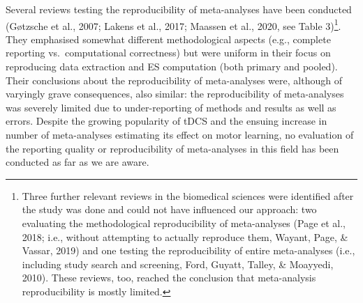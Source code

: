 \documentclass[
  man,floatsintext]{apa6}
\begin{document}
Several reviews testing the reproducibility of meta-analyses have been conducted (Gøtzsche et al., 2007; Lakens et al., 2017; Maassen et al., 2020, see Table 3)\footnote{Three further relevant reviews in the biomedical sciences were identified after the study was done and could not have influenced our approach: two evaluating the methodological reproducibility of meta-analyses (Page et al., 2018; i.e., without attempting to actually reproduce them, Wayant, Page, \& Vassar, 2019) and one testing the reproducibility of entire meta-analyses (i.e., including study search and screening, Ford, Guyatt, Talley, \& Moayyedi, 2010). These reviews, too, reached the conclusion that meta-analysis reproducibility is mostly limited.}. They emphasised somewhat different methodological aspects (e.g., complete reporting vs.~computational correctness) but were uniform in their focus on reproducing data extraction and ES computation (both primary and pooled). Their conclusions about the reproducibility of meta-analyses were, although of varyingly grave consequences, also similar: the reproducibility of meta-analyses was severely limited due to under-reporting of methods and results as well as errors.
Despite the growing popularity of tDCS and the ensuing increase in number of meta-analyses estimating its effect on motor learning, no evaluation of the reporting quality or reproducibility of meta-analyses in this field has been conducted as far as we are aware.

\singlespacing
\begingroup\fontsize{10}{12}\selectfont
\end{document}
